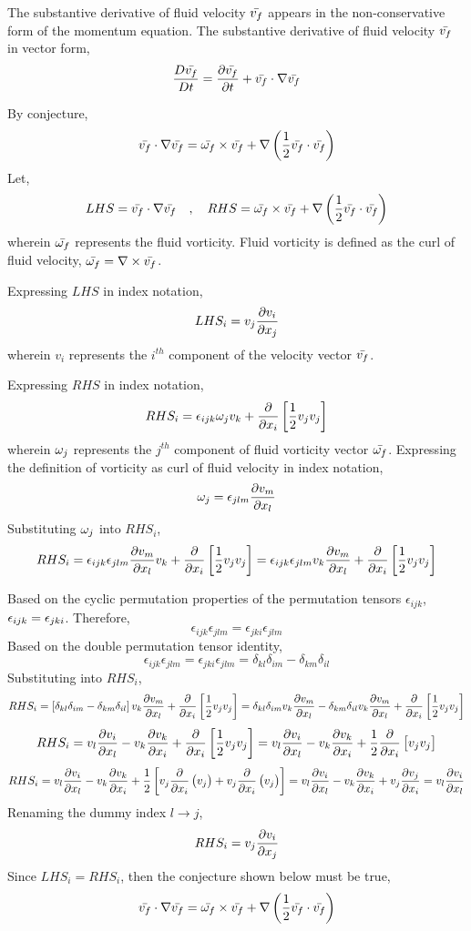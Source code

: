 \documentclass[class=report, 12pt, crop=false]{standalone}
\begin{document}
\begin{center}
The substantive derivative of fluid velocity $\bar{v_f}$ appears in the non-conservative form of the momentum equation. The substantive derivative of fluid velocity $\bar{v_f}$ in vector form,
$$\frac{D \bar{v_f}}{Dt} = \frac{\partial \bar{v_f}}{\partial t} + \bar{v_f}\cdot\nabla\bar{v_f}$$


By conjecture,
$$\bar{v_f}\cdot\nabla\bar{v_f} = \bar{\omega_f}\times \bar{v_f} + \nabla\left(\frac{1}{2}\bar{v_f}\cdot\bar{v_f}\right)$$
Let,
$$LHS = \bar{v_f}\cdot\nabla\bar{v_f} \quad,\quad RHS = \bar{\omega_f}\times \bar{v_f} + \nabla\left(\frac{1}{2}\bar{v_f}\cdot\bar{v_f}\right)$$
wherein $\bar{\omega_f}$ represents the fluid vorticity. Fluid vorticity is defined as the curl of fluid velocity, $\displaystyle \bar{\omega_f} = \nabla\times \bar{v_f}$.

Expressing $LHS$ in index notation,
$$LHS_i = v_j\frac{\partial v_i}{\partial x_j}$$
wherein $v_i$ represents the $i^{th}$ component of the velocity vector $\bar{v_f}$. 

Expressing $RHS$ in index notation,
$$RHS_i = \epsilon_{ijk} \omega_j v_k + \frac{\partial}{\partial x_i}\left[\frac{1}{2}v_jv_j\right]$$
wherein $\omega_j$ represents the $j^{th}$ component of fluid vorticity vector $\bar{\omega_f}$. Expressing the definition of vorticity as curl of fluid velocity in index notation,
$$\omega_j = \epsilon_{jlm}\frac{\partial v_m}{\partial x_l}$$
Substituting $\omega_j$ into $RHS_i$,
$$RHS_i = \epsilon_{ijk} \epsilon_{jlm}\frac{\partial v_m}{\partial x_l} v_k + \frac{\partial}{\partial x_i}\left[\frac{1}{2}v_jv_j\right] = \epsilon_{ijk} \epsilon_{jlm} v_k\frac{\partial v_m}{\partial x_l} + \frac{\partial}{\partial x_i}\left[\frac{1}{2}v_jv_j\right]$$

Based on the cyclic permutation properties of the permutation tensors $\epsilon_{ijk}$, $\displaystyle \epsilon_{ijk} = \epsilon_{jki}$. Therefore,
$$\epsilon_{ijk} \epsilon_{jlm} = \epsilon_{jki} \epsilon_{jlm}$$
Based on the double permutation tensor identity,
$$\epsilon_{ijk} \epsilon_{jlm} = \epsilon_{jki} \epsilon_{jlm} = \delta_{kl}\delta_{im} - \delta_{km}\delta_{il}$$
Substituting into $RHS_i$,
$$RHS_i = \left[\delta_{kl}\delta_{im} - \delta_{km}\delta_{il}\right]v_k\frac{\partial v_m}{\partial x_l} + \frac{\partial}{\partial x_i}\left[\frac{1}{2}v_jv_j\right] = \delta_{kl}\delta_{im}v_k\frac{\partial v_m}{\partial x_l} - \delta_{km}\delta_{il}v_k\frac{\partial v_m}{\partial x_l} + \frac{\partial}{\partial x_i}\left[\frac{1}{2}v_jv_j\right]$$
$$RHS_i = v_l\frac{\partial v_i}{\partial x_l} - v_k\frac{\partial v_k}{\partial x_i} + \frac{\partial}{\partial x_i}\left[\frac{1}{2}v_jv_j\right] = v_l\frac{\partial v_i}{\partial x_l} - v_k\frac{\partial v_k}{\partial x_i} + \frac{1}{2}\frac{\partial}{\partial x_i}\left[v_jv_j\right]$$
$$RHS_i = v_l\frac{\partial v_i}{\partial x_l} - v_k\frac{\partial v_k}{\partial x_i} + \frac{1}{2}\left[v_j\frac{\partial}{\partial x_i}\left(v_j\right) + v_j\frac{\partial}{\partial x_i}\left(v_j\right)\right] = v_l\frac{\partial v_i}{\partial x_l} - v_k\frac{\partial v_k}{\partial x_i} + v_j\frac{\partial v_j}{\partial x_i} = v_l\frac{\partial v_i}{\partial x_l}$$
Renaming the dummy index $l\to j$,
$$RHS_i = v_j\frac{\partial v_i}{\partial x_j}$$
Since $LHS_i = RHS_i$, then the conjecture shown below must be true,
$$\bar{v_f}\cdot\nabla\bar{v_f} = \bar{\omega_f}\times \bar{v_f} + \nabla\left(\frac{1}{2}\bar{v_f}\cdot\bar{v_f}\right)$$


\end{center}
\end{document}
